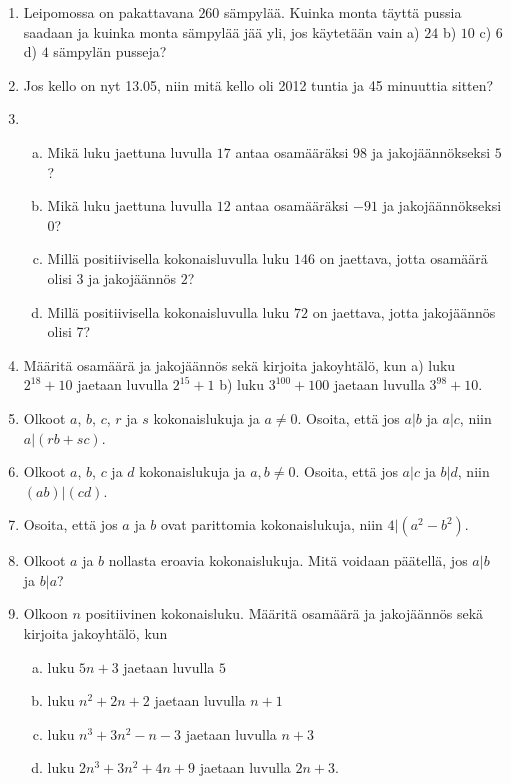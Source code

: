 \begin{enumerate}
\item Leipomossa on pakattavana $260$ sämpylää. Kuinka monta täyttä pussia saadaan ja kuinka monta sämpylää jää yli, jos käytetään vain a) $24$ b) $10$ c) $6$ d) $4$ sämpylän pusseja?

\item 
Jos kello on nyt 13.05, niin mitä kello oli 2012 tuntia ja 45 minuuttia sitten?

\item 
\begin{enumerate}[a)]
\item Mikä luku jaettuna luvulla $17$ antaa osamääräksi $98$ ja jakojäännökseksi $5$?
\item Mikä luku jaettuna luvulla $12$ antaa osamääräksi $-91$ ja jakojäännökseksi $0$?
\item Millä positiivisella kokonaisluvulla luku $146$ on jaettava, jotta osamäärä olisi $3$ ja jakojäännös $2$?
\item Millä positiivisella kokonaisluvulla luku $72$ on jaettava, jotta jakojäännös olisi 7?
\end{enumerate}

\item Määritä osamäärä ja jakojäännös sekä kirjoita jakoyhtälö, kun a) luku $2^{18} + 10$ jaetaan luvulla $2^{15} + 1$ b) luku $3^{100} + 100$ jaetaan luvulla $3^{98} + 10$.

\item Olkoot $a$, $b$, $c$, $r$ ja $s$ kokonaislukuja ja $a \neq 0$. Osoita, että jos $a|b$ ja $a|c$, niin $a|(rb + sc)$.

\item Olkoot $a$, $b$, $c$ ja $d$ kokonaislukuja ja $a,b \neq 0$. Osoita, että jos $a|c$ ja $b|d$, niin $(ab)|(cd)$.

\item Osoita, että jos $a$ ja $b$ ovat parittomia kokonaislukuja, niin $4 | (a^2 - b^2)$.

\item Olkoot $a$ ja $b$ nollasta eroavia kokonaislukuja. Mitä voidaan päätellä, jos $a|b$ ja $b|a$?

\item Olkoon $n$ positiivinen kokonaisluku. Määritä osamäärä ja jakojäännös sekä kirjoita jakoyhtälö, kun
\begin{enumerate}[a)]
\item luku $5n + 3$ jaetaan luvulla $5$
\item luku $n^2 + 2n + 2$ jaetaan luvulla $n + 1$
\item luku $n^3 + 3n^2 - n - 3$ jaetaan luvulla $n + 3$
\item luku $2n^3 + 3n^2 + 4n + 9$ jaetaan luvulla $2n + 3$.
\end{enumerate}


\end{enumerate}
